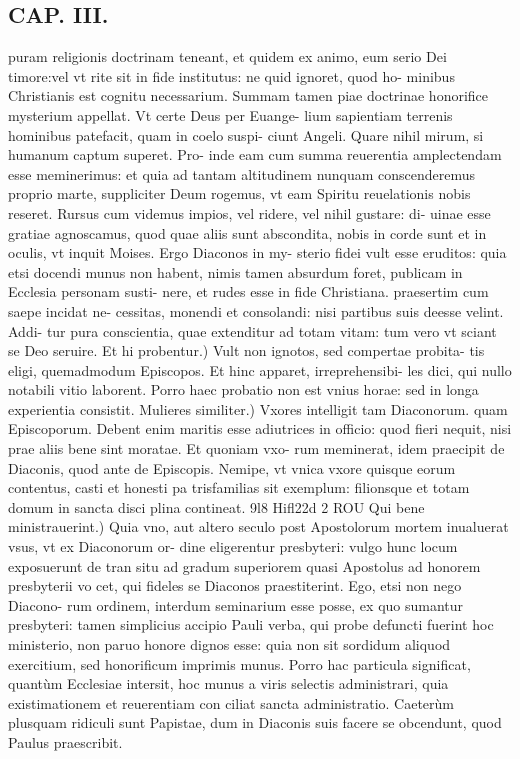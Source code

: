 \documentclass{article}
\begin{document}
\begin{pages}
\section*{CAP. III. }
\marginpar{[ p.37 ]}\pstart puram religionis doctrinam teneant, et quidem ex animo, eum serio Dei timore:vel vt rite sit in fide institutus: ne quid ignoret, quod ho- minibus Christianis est cognitu necessarium. Summam tamen piae doctrinae honorifice mysterium appellat. Vt certe Deus per Euange- lium sapientiam terrenis hominibus patefacit, quam in coelo suspi- ciunt Angeli. Quare nihil mirum, si humanum captum superet. Pro- inde eam cum summa reuerentia amplectendam esse meminerimus: et quia ad tantam altitudinem nunquam conscenderemus proprio marte, suppliciter Deum rogemus, vt eam Spiritu reuelationis nobis reseret. Rursus cum videmus impios, vel ridere, vel nihil gustare: di- uinae esse gratiae agnoscamus, quod quae aliis sunt abscondita, nobis in corde sunt et in oculis, vt inquit Moises. Ergo Diaconos in my- sterio fidei vult esse eruditos: quia etsi docendi munus non habent, nimis tamen absurdum foret, publicam in Ecclesia personam susti- nere, et rudes esse in fide Christiana. praesertim cum saepe incidat ne- cessitas, monendi et consolandi: nisi partibus suis deesse velint. Addi- tur pura conscientia, quae extenditur ad totam vitam: tum vero vt sciant se Deo seruire.  \pend\pstart Et hi probentur.) Vult non ignotos, sed compertae probita- tis eligi, quemadmodum Episcopos. Et hinc apparet, irreprehensibi- les dici, qui nullo notabili vitio laborent. Porro haec probatio non est vnius horae: sed in longa experientia consistit.  \pend\pstart Mulieres similiter.) Vxores intelligit tam Diaconorum. quam Episcoporum. Debent enim maritis esse adiutrices in officio: quod fieri nequit, nisi prae aliis bene sint moratae. Et quoniam vxo- rum meminerat, idem praecipit de Diaconis, quod ante de Episcopis. Nemipe, vt vnica vxore quisque eorum contentus, casti et honesti pa trisfamilias sit exemplum: filionsque et totam domum in sancta disci plina contineat. 9l8 Hifl22d 2 ROU  \pend\pstart Qui bene ministrauerint.) Quia vno, aut altero seculo post Apostolorum mortem inualuerat vsus, vt ex Diaconorum or- dine eligerentur presbyteri: vulgo hunc locum exposuerunt de tran situ ad gradum superiorem quasi Apostolus ad honorem presbyterii vo cet, qui fideles se Diaconos praestiterint. Ego, etsi non nego Diacono- rum ordinem, interdum seminarium esse posse, ex quo sumantur presbyteri: tamen simplicius accipio Pauli verba, qui probe defuncti fuerint hoc ministerio, non paruo honore dignos esse: quia non sit sordidum aliquod exercitium, sed honorificum imprimis munus. Porro hac particula significat, quantùm Ecclesiae intersit, hoc munus a viris selectis administrari, quia existimationem et reuerentiam con ciliat sancta administratio. Caeterùm plusquam ridiculi sunt Papistae, dum in Diaconis suis facere se obcendunt, quod Paulus praescribit.  \pend

\end{pages}
\end{document}
